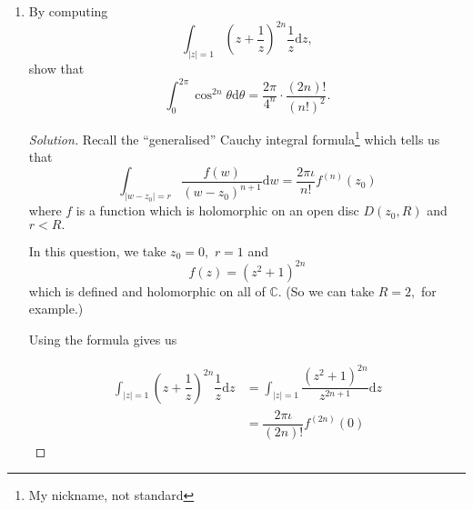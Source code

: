\documentclass[12pt]{article}
\theoremstyle{definition}
\newenvironment{soln}{\begin{proof}[Solution]}{\end{proof}}
\begin{document}
\begin{enumerate}
\begin{soln}
\begin{enumerate}
		Moreover, if $|y| \le R,$ we get that
		\begin{equation*} 
			\left|\cosh ty\right| \le \left|\cosh y\right| \le \cosh R
		\end{equation*}
		for all $t \in [0, 1].$

		Thus, we get
		\begin{align*} 
			\left|\int_{0}^{1} (1 - t)^{2N + 1}\cos^{(2N+2)}(tz){\mathrm{d}}t\right| &\le \int_{0}^{1} (1 - t)^{2N + 1}\left|\cos^{(2N + 1)}(tz)\right|{\mathrm{d}}t\\
			&\le \int_{0}^{1} (1 - t)^{2N + 1} \cosh R {\mathrm{d}}t\\
			&= \dfrac{\cosh R}{2N + 2}.
		\end{align*}
		As earlier, the desired result follows. \qedhere
		\end{enumerate}
	\end{soln}
	\item By computing
	\begin{equation*} 
		\int_{|z| = 1}^{} \left(z + \dfrac{1}{z}\right)^{2n}\dfrac{1}{z} {\mathrm{d}}z,
	\end{equation*}
	show that
	\begin{equation*} 
		\int_{0}^{2\pi} \cos^{2n}\theta {\mathrm{d}}\theta = \dfrac{2\pi}{4^n}\cdot\dfrac{(2n)!}{(n!)^2}.
	\end{equation*}
	\begin{soln}
		Recall the ``generalised'' Cauchy integral formula\footnote{My nickname, not standard} which tells us that
		\begin{equation*} 
			\int_{|w - z_0| = r}^{} \dfrac{f(w)}{(w - z_0)^{n+1}} {\mathrm{d}}w = \dfrac{2\pi\iota}{n!}f^{(n)}(z_0)
		\end{equation*}
		where $f$ is a function which is holomorphic on an open disc $D(z_0, R)$ and $r < R.$

		In this question, we take $z_0 = 0,$ $r = 1$ and
		\begin{equation*} 
			f(z) = (z^2 + 1)^{2n}
		\end{equation*}
		which is defined and holomorphic on all of $\mathbb{C}.$ (So we can take $R = 2,$ for example.)

		Using the formula gives us

		\begin{align*} 
			\int_{|z| = 1}^{} \left(z + \dfrac{1}{z}\right)^{2n}\dfrac{1}{z} {\mathrm{d}}z &= \int_{|z| = 1}^{} \dfrac{(z^2 + 1)^{2n}}{z^{2n + 1}} {\mathrm{d}}z\\
			&= \dfrac{2\pi\iota}{(2n)!}f^{(2n)}(0)
		\end{align*}


\end{soln}
\end{enumerate}
\end{document}
